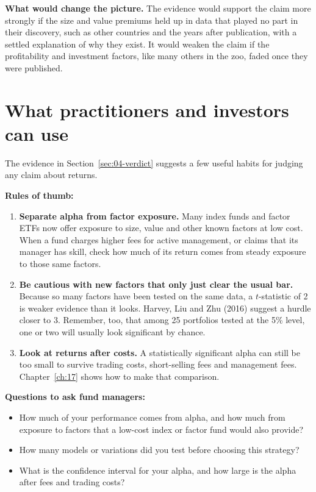 \textbf{What would change the picture.} The evidence would support the claim more strongly if the size and value premiums held up in data that played no part in their discovery, such as other countries and the years after publication, with a settled explanation of why they exist. It would weaken the claim if the profitability and investment factors, like many others in the zoo, faded once they were published.

\section{What practitioners and investors can use}
\label{sec:04-investors}

The evidence in Section~\ref{sec:04-verdict} suggests a few useful habits for judging any claim about returns.

\textbf{Rules of thumb:}
\begin{enumerate}
  \item \textbf{Separate alpha from factor exposure.} Many index funds and factor ETFs now offer exposure to size, value and other known factors at low cost. When a fund charges higher fees for active management, or claims that its manager has skill, check how much of its return comes from steady exposure to those same factors. 
  \item \textbf{Be cautious with new factors that only just clear the usual bar.} Because so many factors have been tested on the same data, a $t$-statistic of 2 is weaker evidence than it looks. Harvey, Liu and Zhu (2016) suggest a hurdle closer to 3. Remember, too, that among 25 portfolios tested at the 5\% level, one or two will usually look significant by chance.
  \item \textbf{Look at returns after costs.} A statistically significant alpha can still be too small to survive trading costs, short-selling fees and management fees. Chapter~\ref{ch:17} shows how to make that comparison.
\end{enumerate}

\textbf{Questions to ask fund managers:}
\begin{itemize}
  \item How much of your performance comes from alpha, and how much from exposure to factors that a low-cost index or factor fund would also provide?
  \item How many models or variations did you test before choosing this strategy?
  \item What is the confidence interval for your alpha, and how large is the alpha after fees and trading costs?
\end{itemize}

